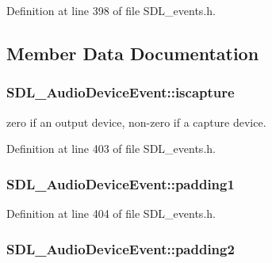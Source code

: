 Definition at line 398 of file S\-D\-L\-\_\-events.\-h.



\subsection{Member Data Documentation}
\hypertarget{struct_s_d_l___audio_device_event_a1482dcd50b47046ef8e9bfa7cc7457d9}{
\subsubsection[{iscapture}]{ S\-D\-L\-\_\-\-Audio\-Device\-Event\-::iscapture}}\label{struct_s_d_l___audio_device_event_a1482dcd50b47046ef8e9bfa7cc7457d9}
zero if an output device, non-\/zero if a capture device. 

Definition at line 403 of file S\-D\-L\-\_\-events.\-h.

\hypertarget{struct_s_d_l___audio_device_event_ad6efdec7189e735f4a05fc123c0cb723}{
\subsubsection[{padding1}]{ S\-D\-L\-\_\-\-Audio\-Device\-Event\-::padding1}}\label{struct_s_d_l___audio_device_event_ad6efdec7189e735f4a05fc123c0cb723}


Definition at line 404 of file S\-D\-L\-\_\-events.\-h.

\hypertarget{struct_s_d_l___audio_device_event_adf9bebd56d707860045d31359535a2a4}{
\subsubsection[{padding2}]{ S\-D\-L\-\_\-\-Audio\-Device\-Event\-::padding2}}\label{struct_s_d_l___audio_device_event_adf9bebd56d707860045d31359535a2a4}


